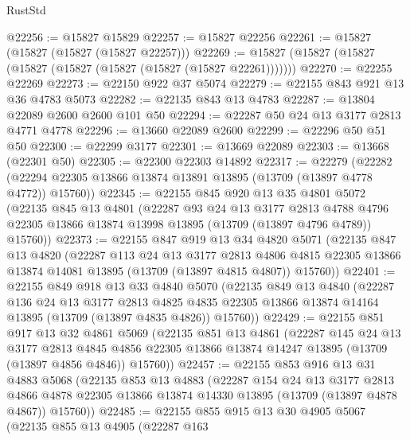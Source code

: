 \begin{lexlean}{RustStd}
\begin{coremodule}
@22256 := @15827 @15829
@22257 := @15827 @22256
@22261 := @15827 (@15827 (@15827 (@15827 @22257)))
@22269 := @15827 (@15827 (@15827 (@15827 (@15827 (@15827 (@15827 (@15827 @22261)))))))
@22270 := @22255 @22269
@22273 := @22150 @922 @37 @5074
@22279 := @22155 @843 @921 @13 @36 @4783 @5073
@22282 := @22135 @843 @13 @4783
@22287 := @13804 @22089 @2600 @2600 @101 @50
@22294 := @22287 @50 @24 @13 @3177 @2813 @4771 @4778
@22296 := @13660 @22089 @2600
@22299 := @22296 @50 @51 @50
@22300 := @22299 @3177
@22301 := @13669 @22089
@22303 := @13668 (@22301 @50)
@22305 := @22300 @22303 @14892
@22317 := @22279
    (@22282 (@22294 @22305 @13866 @13874 @13891 @13895 (@13709 (@13897 @4778 @4772)) @15760))
@22345 := @22155
    @845
    @920
    @13
    @35
    @4801
    @5072
    (@22135
      @845
      @13
      @4801
      (@22287
        @93
        @24
        @13
        @3177
        @2813
        @4788
        @4796
        @22305
        @13866
        @13874
        @13998
        @13895
        (@13709 (@13897 @4796 @4789))
        @15760))
@22373 := @22155
    @847
    @919
    @13
    @34
    @4820
    @5071
    (@22135
      @847
      @13
      @4820
      (@22287
        @113
        @24
        @13
        @3177
        @2813
        @4806
        @4815
        @22305
        @13866
        @13874
        @14081
        @13895
        (@13709 (@13897 @4815 @4807))
        @15760))
@22401 := @22155
    @849
    @918
    @13
    @33
    @4840
    @5070
    (@22135
      @849
      @13
      @4840
      (@22287
        @136
        @24
        @13
        @3177
        @2813
        @4825
        @4835
        @22305
        @13866
        @13874
        @14164
        @13895
        (@13709 (@13897 @4835 @4826))
        @15760))
@22429 := @22155
    @851
    @917
    @13
    @32
    @4861
    @5069
    (@22135
      @851
      @13
      @4861
      (@22287
        @145
        @24
        @13
        @3177
        @2813
        @4845
        @4856
        @22305
        @13866
        @13874
        @14247
        @13895
        (@13709 (@13897 @4856 @4846))
        @15760))
@22457 := @22155
    @853
    @916
    @13
    @31
    @4883
    @5068
    (@22135
      @853
      @13
      @4883
      (@22287
        @154
        @24
        @13
        @3177
        @2813
        @4866
        @4878
        @22305
        @13866
        @13874
        @14330
        @13895
        (@13709 (@13897 @4878 @4867))
        @15760))
@22485 := @22155
    @855
    @915
    @13
    @30
    @4905
    @5067
    (@22135
      @855
      @13
      @4905
      (@22287
        @163

\end{coremodule}
\end{lexlean}
